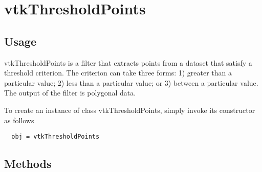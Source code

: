 \section{vtkThresholdPoints}

\subsection{Usage}

 vtkThresholdPoints is a filter that extracts points from a dataset that 
 satisfy a threshold criterion. The criterion can take three forms:
 1) greater than a particular value; 2) less than a particular value; or
 3) between a particular value. The output of the filter is polygonal data.

To create an instance of class vtkThresholdPoints, simply
invoke its constructor as follows
\begin{verbatim}
  obj = vtkThresholdPoints
\end{verbatim}
\subsection{Methods}

